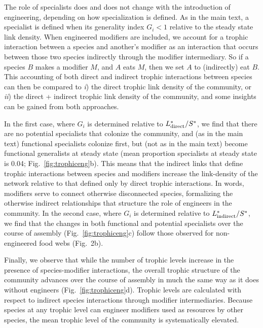 \documentclass[onecolumn,preprintnumbers,amsmath,amssymb,superscriptaddress]{revtex4-1}
\begin{document}
\begin{bibunit}
The role of specialists does and does not change with the introduction of engineering, depending on how specialization is defined.
As in the main text, a specialist is defined when its generality index $G_i < 1$ relative to the steady state link density.
When engineered modifiers are included, we account for a trophic interaction between a species and another's modifier as an interaction that occurs between those two species indirectly through the modifier intermediary.
So if a species $B$ makes a modifier $M$, and $A$ eats $M$, then we set $A$ to (indirectly) eat $B$.
This accounting of both direct and indirect trophic interactions between species can then be compared to \emph{i}) the direct trophic link density of the community, or \emph{ii}) the direct + indirect trophic link density of the community, and some insights can be gained from both approaches.

In the first case, where $G_i$ is determined relative to $L^*_{\rm direct}/S^*$, we find that there are no potential specialists that colonize the community, and (as in the main text) functional specialists colonize first, but (not as in the main text) become functional generalists at steady state (mean proportion specialists at steady state is 0.04; Fig.\ \ref{fig:trophiceng}b).
This means that the indirect links that define trophic interactions between species and modifiers increase the link-density of the network relative to that defined only by direct trophic interactions.
In words, modifiers serve to connect otherwise disconnected species, formalizing the otherwise indirect relationships that structure the role of engineers in the community.
In the second case, where $G_i$ is determined relative to $L^*_{\rm indirect}/S^*$, we find that the changes in both functional and potential specialists over the course of assembly (Fig.\ \ref{fig:trophiceng}c) follow those observed for non-engineered food webs (Fig.\ 2b).

Finally, we observe that while the number of trophic levels increase in the presence of species-modifier interactions, the overall trophic structure of the community advances over the course of assembly in much the same way as it does without engineers (Fig.\ \ref{fig:trophiceng}d).
Trophic levels are calculated with respect to indirect species interactions through modifier intermediaries.
Because species at any trophic level can engineer modifiers used as resources by other species, the mean trophic level of the community is systematically elevated.

\clearpage


\end{bibunit}
\end{document}
